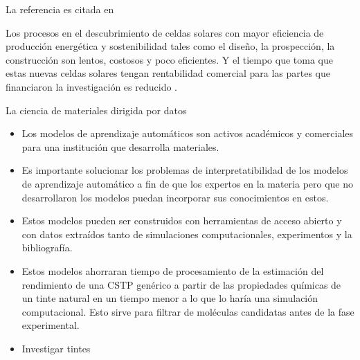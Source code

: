 La referencia es citada en \cite{wen2020}

Los procesos en el descubrimiento de celdas solares con mayor
eficiencia de producción energética y sostenibilidad tales como
el diseño, la prospección, la construcción son lentos, costosos y
poco eficientes. Y el tiempo que toma que estas nuevas celdas solares
tengan rentabilidad comercial para las partes que financiaron la investigación
es reducido \cite{eagar_bringing_1995}. 


La ciencia de materiales dirigida por datos 

\begin{itemize}
    \item Los modelos de aprendizaje automáticos son activos académicos y comerciales para una institución que desarrolla materiales.
    \item Es importante solucionar los problemas de interpretatibilidad de los modelos de aprendizaje automático a fin de que los expertos en la materia pero que no desarrollaron los modelos puedan incorporar sus conocimientos en estos.
    \item Estos modelos pueden ser construidos con herramientas de acceso abierto y con datos extraídos tanto de simulaciones computacionales, experimentos y la bibliografía.
    \item Estos modelos ahorraran tiempo de procesamiento de la estimación del rendimiento de una CSTP genérico a partir de las propiedades químicas de un tinte natural en un tiempo menor a lo que lo haría una simulación computacional. Esto sirve para filtrar de moléculas candidatas antes de la fase experimental.
    \item Investigar tintes
\end{itemize}
